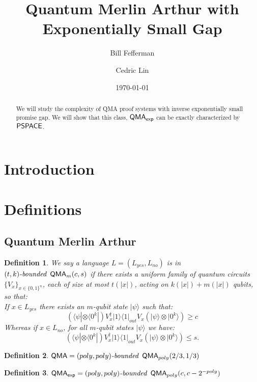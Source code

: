 \documentclass[11pt]{article}
\newtheorem{definition}{Definition}
\theoremstyle{definition}
\theoremstyle{remark}
\newcommand\PSPACE{{\sf{PSPACE}}}
\newcommand\QMAexp{{\sf{QMA}_{exp}}}
\newcommand\bddQMA[5]{{\left(#1,#2\right)}\textit{-bounded }\QMA_{#3}(#4,#5)}
\newcommand{\ket}[1]{|#1\rangle}
\newcommand{\bra}[1]{\langle#1|}
\begin{document}
\title{Quantum Merlin Arthur with Exponentially Small Gap}
\author[1]{Bill Fefferman}
\author[1]{Cedric Lin}
\date{\today}

\maketitle

\begin{abstract}
We will study the complexity of QMA proof systems with inverse exponentially small promise gap.  We will show that this class, $\QMAexp$ can be exactly characterized by $\PSPACE$.
\end{abstract}

\section{Introduction}
\section{Definitions}

\subsection{Quantum Merlin Arthur}\label{def:qma}
\begin{definition}We say a language $L=(L_{yes},L_{no})$ is in $\bddQMA{t}{k}{m}{c}{s}$ if there exists a uniform family of quantum circuits $\{ V_x\}_{x\in\{0,1\}^n}$, each of size at most $t(|x|)$, acting on $k(|x|)+m(|x|)$ qubits, so that:\\

If $x \in L_{yes}$ there exists an $m$-qubit state $\ket{\psi}$ such that:
\begin{equation}
\left(\bra{\psi}\otimes \bra{0^k}\right) V^\dagger_x \ket{1}\bra{1}_{out} V_x \left(\ket{\psi}\otimes \ket{0^k}\right) \ge c
\end{equation}
Whereas if $x \in L_{no}$, for all $m$-qubit states $\ket{\psi}$ we have:
\begin{equation}
\left(\bra{\psi}\otimes \bra{0^k}\right) V^\dagger_x \ket{1}\bra{1}_{out} V_x \left(\ket{\psi}\otimes \ket{0^k}\right) \le s.
\end{equation}

  \end{definition}

\begin{definition} $\QMA=\bddQMA{poly}{poly}{poly}{2/3}{1/3}$\end{definition}
\begin{definition} $\QMAexp=\bddQMA{poly}{poly}{poly}{c}{c-2^{-poly}}$	
\end{definition}
\end{document}
